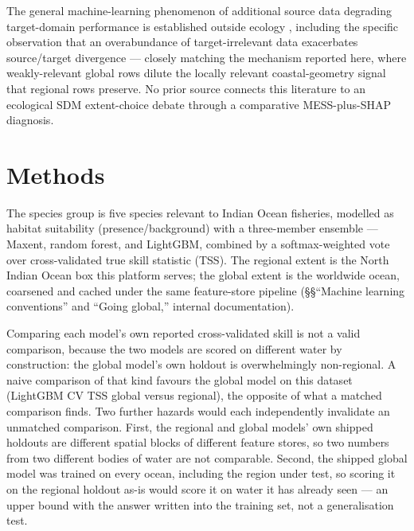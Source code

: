  The general machine-learning phenomenon of additional
source data degrading target-domain performance is established outside
ecology \citep{zhang2021survey}, including the specific observation that an
overabundance of target-irrelevant data exacerbates source/target divergence
--- closely matching the mechanism reported here, where \NGlobalTrain{}
weakly-relevant global rows dilute the locally relevant coastal-geometry
signal that \NRegionalTrain{} regional rows preserve. No prior source connects
this literature to an ecological SDM extent-choice debate through a
comparative MESS-plus-SHAP diagnosis.

\section{Methods}

 The species group is five species relevant to Indian
Ocean fisheries, modelled as habitat suitability (presence/background) with a
three-member ensemble --- Maxent, random forest, and LightGBM, combined by a
softmax-weighted vote over cross-validated true skill statistic (TSS). The
regional extent is the North Indian Ocean box this platform serves; the
global extent is the worldwide ocean, coarsened and cached under the same
feature-store pipeline (\S\S ``Machine learning conventions'' and ``Going
global,'' internal documentation).

 Comparing each model's own reported
cross-validated skill is not a valid comparison, because the two models are
scored on different water by construction: the global model's own holdout is
overwhelmingly non-regional. A naive comparison of that kind favours the
global model on this dataset (LightGBM CV TSS \CVTSSGlobalLGBM{} global versus
\CVTSSRegionLGBM{} regional), the opposite of what a matched comparison finds.
Two further hazards would each independently invalidate an unmatched
comparison. First, the regional and global models' own shipped holdouts are
different spatial blocks of different feature stores, so two numbers from two
different bodies of water are not comparable. Second, the shipped global
model was trained on every ocean, including the region under test, so scoring
it on the regional holdout as-is would score it on water it has already seen
--- an upper bound with the answer written into the training set, not a
generalisation test.

